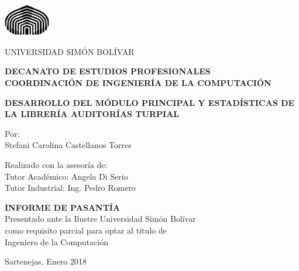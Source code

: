 \thispagestyle{empty}

\begin{center}
    \begin{singlespace}
        \includegraphics[width=2cm]{logo_USB}
        
        {\large
          UNIVERSIDAD SIMÓN BOLÍVAR\\
        }
        
        \textbf{
          DECANATO DE ESTUDIOS PROFESIONALES\\
          COORDINACIÓN DE INGENIERÍA DE LA COMPUTACIÓN
        }
        
        \vspace{4cm}%
        \textbf{
          DESARROLLO DEL MÓDULO PRINCIPAL Y ESTADÍSTICAS DE LA LIBRERÍA AUDITORÍAS TURPIAL
        }
        \vspace{4cm}
        
        Por:\\
        Stefani Carolina Castellanos Torres
        
        \vspace{1cm}
        Realizado con la asesoría de:\\
        Tutor Académico: Angela Di Serio\\
        Tutor Industrial: Ing. Pedro Romero
        
        \vspace{2cm}
          \textbf{INFORME DE PASANTÍA}\\
          Presentado ante la Ilustre Universidad Simón Bolívar\\
          como requisito parcial para optar al título de\\
          Ingeniero de la Computación\\
        \selectfont
        
        \vspace{3cm}
    Sartenejas, Enero 2018
    
    \end{singlespace}
\end{center}


